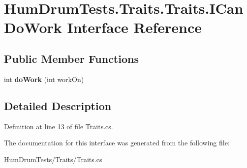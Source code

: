 \hypertarget{interfaceHumDrumTests_1_1Traits_1_1Traits_1_1ICanDoWork}{}\section{Hum\+Drum\+Tests.\+Traits.\+Traits.\+I\+Can\+Do\+Work Interface Reference}
\label{interfaceHumDrumTests_1_1Traits_1_1Traits_1_1ICanDoWork}
\subsection*{Public Member Functions}
\begin{DoxyCompactItemize}
\item 
int {\bfseries do\+Work} (int work\+On)\hypertarget{interfaceHumDrumTests_1_1Traits_1_1Traits_1_1ICanDoWork_a47299fd82eeb6ff377ef82a1520adbf2}{}\label{interfaceHumDrumTests_1_1Traits_1_1Traits_1_1ICanDoWork_a47299fd82eeb6ff377ef82a1520adbf2}

\end{DoxyCompactItemize}


\subsection{Detailed Description}


Definition at line 13 of file Traits.\+cs.



The documentation for this interface was generated from the following file\+:\begin{DoxyCompactItemize}
\item 
Hum\+Drum\+Tests/\+Traits/Traits.\+cs\end{DoxyCompactItemize}
